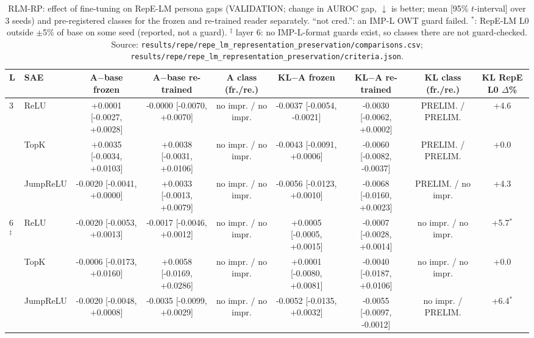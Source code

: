\begin{table}[t]
\centering
\small
\caption{RLM-RP: effect of fine-tuning on RepE-LM persona gaps (VALIDATION; change in AUROC gap, $\downarrow$ is better; mean [95\% $t$-interval] over 3 seeds) and pre-registered classes for the frozen and re-trained reader separately. ``not cred.'': an IMP-L OWT guard failed. $^\ast$: RepE-LM L0 outside $\pm$5\% of base on some seed (reported, not a guard). $^\ddagger$ layer 6: no IMP-L-format guards exist, so classes there are not guard-checked. Source: \texttt{results/\allowbreak{}repe/\allowbreak{}repe\_lm\_representation\_preservation/\allowbreak{}comparisons.csv}; \texttt{results/\allowbreak{}repe/\allowbreak{}repe\_lm\_representation\_preservation/\allowbreak{}criteria.json}.}
\label{tab:rlm_finetune}
\begin{adjustbox}{max width=\linewidth}
\begin{tabular}{llccccccc}
\toprule
L & SAE & A$-$base frozen & A$-$base re-trained & A class (fr./re.) & KL$-$A frozen & KL$-$A re-trained & KL class (fr./re.) & KL RepE L0 $\Delta$\% \\
\midrule
3 & ReLU & +0.0001 [-0.0027, +0.0028] & -0.0000 [-0.0070, +0.0070] & no impr. / no impr. & -0.0037 [-0.0054, -0.0021] & -0.0030 [-0.0062, +0.0002] & PRELIM. / PRELIM. & +4.6 \\
 & TopK & +0.0035 [-0.0034, +0.0103] & +0.0038 [-0.0031, +0.0106] & no impr. / no impr. & -0.0043 [-0.0091, +0.0006] & -0.0060 [-0.0082, -0.0037] & PRELIM. / PRELIM. & +0.0 \\
 & JumpReLU & -0.0020 [-0.0041, +0.0000] & +0.0033 [-0.0013, +0.0079] & no impr. / no impr. & -0.0056 [-0.0123, +0.0010] & -0.0068 [-0.0160, +0.0023] & PRELIM. / no impr. & +4.3 \\
\midrule
6$^\ddagger$ & ReLU & -0.0020 [-0.0053, +0.0013] & -0.0017 [-0.0046, +0.0012] & no impr. / no impr. & +0.0005 [-0.0005, +0.0015] & -0.0007 [-0.0028, +0.0014] & no impr. / no impr. & +5.7$^\ast$ \\
 & TopK & -0.0006 [-0.0173, +0.0160] & +0.0058 [-0.0169, +0.0286] & no impr. / no impr. & +0.0001 [-0.0080, +0.0081] & -0.0040 [-0.0187, +0.0106] & no impr. / no impr. & +0.0 \\
 & JumpReLU & -0.0020 [-0.0048, +0.0008] & -0.0035 [-0.0099, +0.0029] & no impr. / no impr. & -0.0052 [-0.0135, +0.0032] & -0.0055 [-0.0097, -0.0012] & no impr. / PRELIM. & +6.4$^\ast$ \\

\end{tabular}
\end{adjustbox}
\end{table}
